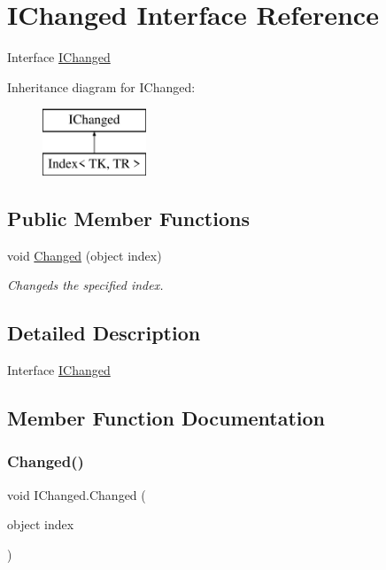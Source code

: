 \hypertarget{interface_i_changed}{}\section{I\+Changed Interface Reference}
\label{interface_i_changed}


Interface \hyperlink{interface_i_changed}{I\+Changed}  


Inheritance diagram for I\+Changed\+:\begin{figure}[H]
\begin{center}
\leavevmode
\includegraphics[height=2.000000cm]{interface_i_changed}
\end{center}
\end{figure}
\subsection*{Public Member Functions}
\begin{DoxyCompactItemize}
\item 
void \hyperlink{interface_i_changed_a7d4904db56316c1cc3aa98b112dd4ca8}{Changed} (object index)
\begin{DoxyCompactList}\small\item\em Changeds the specified index. \end{DoxyCompactList}\end{DoxyCompactItemize}


\subsection{Detailed Description}
Interface \hyperlink{interface_i_changed}{I\+Changed} 



\subsection{Member Function Documentation}
\mbox{\label{interface_i_changed_a7d4904db56316c1cc3aa98b112dd4ca8}} 
\subsubsection{\texorpdfstring{Changed()}{Changed()}}
{\footnotesize\ttfamily void I\+Changed.\+Changed (\begin{DoxyParamCaption}\item[{object}]{index }\end{DoxyParamCaption})}



